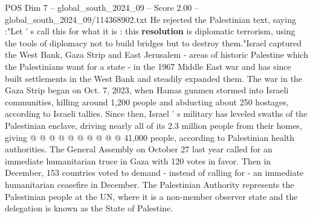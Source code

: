 \begin{textsample}{POS Dim 7 – global\_south\_2024\_09 – Score 2.00 – global\_south\_2024\_09/114368902.txt}
He rejected the Palestinian text, saying :"Let ' s call this for what it is : this \textbf{resolution} is diplomatic terrorism, using the tools of diplomacy not to build bridges but to destroy them."Israel captured the West Bank, Gaza Strip and East Jerusalem - areas of historic Palestine which the Palestinians want for a state - in the 1967 Middle East war and has since built settlements in the West Bank and steadily expanded them.
The war in the Gaza Strip began on Oct. 7, 2023, when Hamas gunmen stormed into Israeli communities, killing around 1,200 people and abducting about 250 hostages, according to Israeli tallies.
Since then, Israel ' s military has leveled swaths of the Palestinian enclave, driving nearly all of its 2.3 million people from their homes, giving @ @ @ @ @ @ @ @ @ @ 41,000 people, according to Palestinian health authorities.
The General Assembly on October 27 last year called for an immediate humanitarian truce in Gaza with 120 votes in favor.
Then in December, 153 countries voted to demand - instead of calling for - an immediate humanitarian ceasefire in December.
The Palestinian Authority represents the Palestinian people at the UN, where it is a non-member observer state and the delegation is known as the State of Palestine.

\end{textsample}
